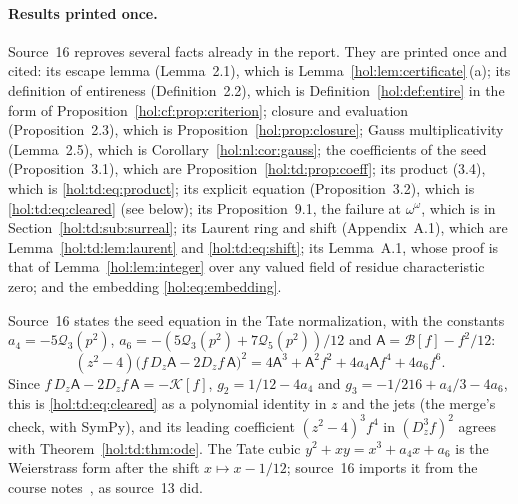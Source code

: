 \documentclass[11pt]{article}
\numberwithin{equation}{section}
\theoremstyle{definition}
\theoremstyle{remark}
\begin{document}
\paragraph{Results printed once.}
Source~16 reproves several facts already in the report. They are printed
once and cited: its escape lemma (Lemma~2.1), which is
Lemma~\ref{hol:lem:certificate}\,(a); its definition of entireness
(Definition~2.2), which is Definition~\ref{hol:def:entire} in the form of
Proposition~\ref{hol:cf:prop:criterion}; closure and evaluation
(Proposition~2.3), which is Proposition~\ref{hol:prop:closure}; Gauss
multiplicativity (Lemma~2.5), which is Corollary~\ref{hol:nl:cor:gauss}; the
coefficients of the seed (Proposition~3.1), which are
Proposition~\ref{hol:td:prop:coeff}; its product (3.4), which is
\eqref{hol:td:eq:product}; its explicit equation (Proposition~3.2), which is
\eqref{hol:td:eq:cleared} (see below); its Proposition~9.1, the failure at
$\omega^\omega$, which is in Section~\ref{hol:td:sub:surreal}; its Laurent
ring and shift (Appendix~A.1), which are Lemma~\ref{hol:td:lem:laurent} and
\eqref{hol:td:eq:shift}; its Lemma~A.1, whose proof is that of
Lemma~\ref{hol:lem:integer} over any valued field of residue characteristic
zero; and the embedding \eqref{hol:eq:embedding}.

Source~16 states the seed equation in the Tate normalization, with the
constants $a_4=-5\mathcal Q_3(p^2)$, $a_6=-(5\mathcal Q_3(p^2)+7\mathcal
Q_5(p^2))/12$ and $\mathsf A=\mathcal B[f]-f^2/12$:
\[
 (z^2-4)\bigl(f\,D_z\mathsf A-2D_zf\,\mathsf A\bigr)^2=4\mathsf A^3+\mathsf
 A^2f^2+4a_4\mathsf Af^4+4a_6f^6 .
\]
Since $f\,D_z\mathsf A-2D_zf\,\mathsf A=-\mathcal K[f]$,
$g_2=1/12-4a_4$ and $g_3=-1/216+a_4/3-4a_6$, this is
\eqref{hol:td:eq:cleared} as a polynomial identity in $z$ and the jets (the
merge's check, with SymPy), and its leading coefficient $(z^2-4)^3f^4$ in
$(D_z^3f)^2$ agrees with Theorem~\ref{hol:td:thm:ode}. The Tate cubic
$y^2+xy=x^3+a_4x+a_6$ is the Weierstrass form after the shift $x\mapsto
x-1/12$; source~16 imports it from the course notes~\cite{woodbury}, as
source~13 did.
\end{document}

